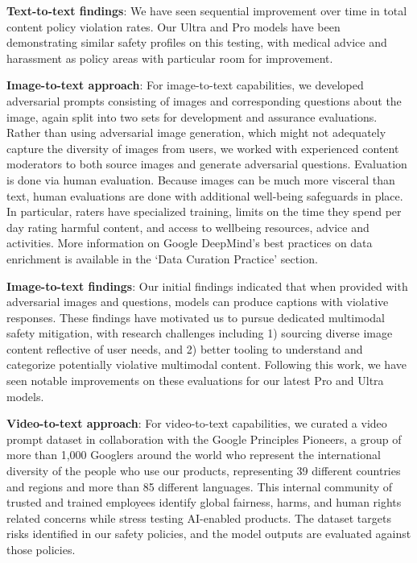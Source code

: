 \textbf{Text-to-text findings}: We have seen sequential improvement over time in total content policy violation rates. Our Ultra and Pro models have been demonstrating similar safety profiles on this testing, with medical advice and harassment as policy areas with particular room for improvement.

\textbf{Image-to-text approach}: For image-to-text capabilities, we developed adversarial prompts consisting of images and corresponding questions about the image, again split into two sets for development and assurance evaluations. Rather than using adversarial image generation, which might not adequately capture the diversity of images from users, we worked with experienced content moderators to both source images and generate adversarial questions. Evaluation is done via human evaluation.  Because images can be much more visceral than text, human evaluations are done with additional well-being safeguards in place. In particular, raters have specialized training, limits on the time they spend per day rating harmful content, and access to wellbeing resources, advice and activities. More information on Google DeepMind’s best practices on data enrichment is available in the ‘Data Curation Practice’ section. 

\textbf{Image-to-text findings}: Our initial findings indicated that when provided with adversarial images and questions, models can produce captions with violative responses. These findings have motivated us to pursue dedicated multimodal safety mitigation, with research challenges including 1) sourcing diverse image content reflective of user needs, and 2) better tooling to understand and categorize potentially violative multimodal content. Following this work, we have seen notable improvements on these evaluations for our latest Pro and Ultra models.

\textbf{Video-to-text approach}: For video-to-text capabilities, we curated a video prompt dataset in collaboration with the Google Principles Pioneers, a group of more than 1,000 Googlers around the world who represent the international diversity of the people who use our products, representing 39 different countries and regions and more than 85 different languages. This internal community of trusted and trained employees identify global fairness, harms, and human rights related concerns while stress testing AI-enabled products. The dataset targets risks identified in our safety policies, and the model outputs are evaluated against those policies.

